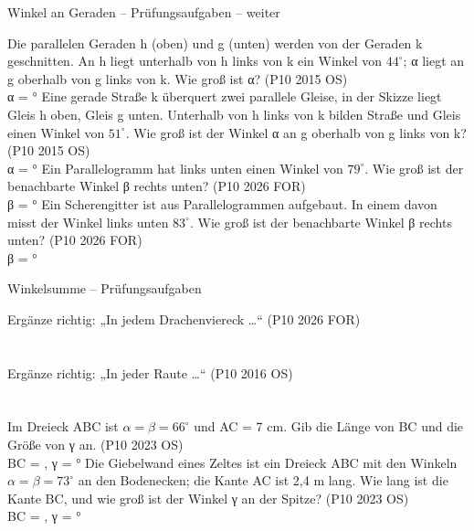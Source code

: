 \begin{aufgabe}{Winkel an Geraden – Prüfungsaufgaben – weiter}
\begin{teile}
\teil Die parallelen Geraden h (oben) und g (unten) werden von der Geraden k geschnitten. An h liegt unterhalb von h links von k ein Winkel von $44^\circ$; α liegt an g oberhalb von g links von k. Wie groß ist α? \hfill (P10 2015 OS) \\

α = \leerfeld °
\teil Eine gerade Straße k überquert zwei parallele Gleise, in der Skizze liegt Gleis h oben, Gleis g unten. Unterhalb von h links von k bilden Straße und Gleis einen Winkel von $51^\circ$. Wie groß ist der Winkel α an g oberhalb von g links von k? \hfill (P10 2015 OS) \\

α = \leerfeld °
\teil Ein Parallelogramm hat links unten einen Winkel von $79^\circ$. Wie groß ist der benachbarte Winkel β rechts unten? \hfill (P10 2026 FOR) \\

β = \leerfeld °
\teil Ein Scherengitter ist aus Parallelogrammen aufgebaut. In einem davon misst der Winkel links unten $83^\circ$. Wie groß ist der benachbarte Winkel β rechts unten? \hfill (P10 2026 FOR) \\

β = \leerfeld °
\end{teile}
\end{aufgabe}

\begin{aufgabe}{Winkelsumme – Prüfungsaufgaben}
\begin{teile}
\teil Ergänze richtig: „In jedem Drachenviereck …“ \hfill (P10 2026 FOR) \\  \\  \\ 
\teil Ergänze richtig: „In jeder Raute …“ \hfill (P10 2016 OS) \\  \\  \\ 
\teil Im Dreieck ABC ist $\alpha = \beta = 66^\circ$ und AC = 7 cm. Gib die Länge von BC und die Größe von γ an. \hfill (P10 2023 OS) \\ BC = \leerfeld[cm] , γ = \leerfeld °
\teil Die Giebelwand eines Zeltes ist ein Dreieck ABC mit den Winkeln $\alpha = \beta = 73^\circ$ an den Bodenecken; die Kante AC ist 2,4 m lang. Wie lang ist die Kante BC, und wie groß ist der Winkel γ an der Spitze? \hfill (P10 2023 OS) \\ BC = \leerfeld[m] , γ = \leerfeld °
\end{teile}
\end{aufgabe}

